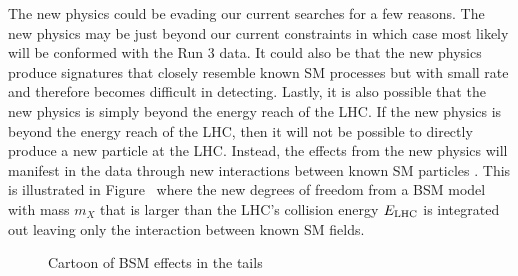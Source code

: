 \documentclass[10pt]{article}
\begin{document}
The new physics could be evading our current searches for a few reasons.
The new physics may be just beyond our current constraints in which case most likely will be conformed with the Run 3 data.
It could also be that the new physics produce signatures that closely resemble known SM processes but with small rate and therefore becomes difficult in detecting.
Lastly, it is also possible that the new physics is simply beyond the energy reach of the LHC.
If the new physics is beyond the energy reach of the LHC, then it will not be possible to directly produce a new particle at the LHC.
Instead, the effects from the new physics will manifest in the data through new interactions between known SM particles \cite{}.
This is illustrated in Figure~ where the new degrees of freedom from a BSM model with mass $m_{X}$ that is larger than the LHC's collision energy $E_{\tiny\textrm{LHC}}$ is integrated out leaving only the interaction between known SM fields.

\begin{figure}[htb]
\centering
    \quad\quad
\caption{Cartoon of BSM effects in the tails}
\label{fig:BSMTails}
\end{figure}
\end{document}
